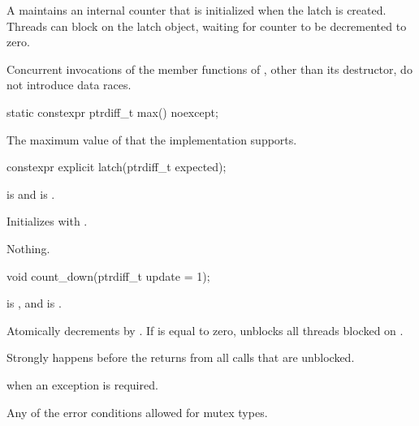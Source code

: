 \pnum
A  maintains an internal counter
that is initialized when the latch is created.
Threads can block on the latch object,
waiting for counter to be decremented to zero.

\pnum
Concurrent invocations of the member functions of ,
other than its destructor, do not introduce data races.

%
\begin{itemdecl}
static constexpr ptrdiff_t max() noexcept;
\end{itemdecl}

\begin{itemdescr}
\pnum
\returns
The maximum value of  that the implementation supports.
\end{itemdescr}

%
\begin{itemdecl}
constexpr explicit latch(ptrdiff_t expected);
\end{itemdecl}

\begin{itemdescr}
\pnum
\expects
{} is  and
 is .

\pnum
\effects
Initializes  with .

\pnum
\throws
Nothing.
\end{itemdescr}

%
\begin{itemdecl}
void count_down(ptrdiff_t update = 1);
\end{itemdecl}

\begin{itemdescr}
\pnum
\expects
{} is , and
 is .

\pnum
\effects
Atomically decrements  by .
If  is equal to zero,
unblocks all threads blocked on .

\pnum
\sync
Strongly happens before the returns from all calls that are unblocked.

\pnum
\throws
{} when an exception is required.

\pnum
\errors
Any of the error conditions
allowed for mutex types.
\end{itemdescr}

